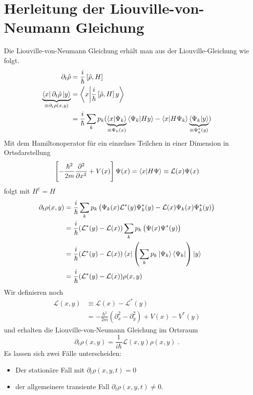 \section{Herleitung der Liouville-von-Neumann Gleichung}
Die Liouville-von-Neumann Gleichung erhält man aus der Liouville-Gleichung wie folgt.
\begin{align}
  \partial_t \hat{\rho} &= \frac{i}{\hbar}\left[\hat{\rho} , H\right] \\
  \underbrace{\bra{x} \partial_t \hat{\rho} \ket{y}}_{\equiv \partial_t \rho(x,y)} &= \bra{x}\ket{\frac{i}{\hbar}\left[\hat{\rho} , H\right]y} \\
   &= \frac{i}{\hbar} \sum_k p_k ( \underbrace{\bra{x}\ket{\Psi_k}}_{\equiv \Psi_k(x)}\bra{\Psi_k}\ket{Hy} - \bra{x}\ket{H\Psi_k}\underbrace{\bra{\Psi_k}\ket{y}}_{\equiv \Psi_k^*(y)} )
\end{align}
Mit dem Hamiltonoperator für ein einzelnes Teilchen in einer Dimension in Ortsdarstellung
\begin{align}
  \left[ -\frac{\hbar^2}{2m}\frac{\partial^2}{\partial x^2} + V(x) \right] \Psi(x) = \bra{x}\ket{H\Psi} \equiv \mathcal{L}(x)\Psi(x)
  \label{eq:Liouville-Operator}
\end{align}
folgt mit $H^{\dagger} = H$
\begin{align}
  \partial_t \rho(x,y) &= \frac{i}{\hbar} \sum_k p_k \left( \Psi_k(x)\mathcal{L}^*(y)\Psi_k^*(y) - \mathcal{L}(x)\Psi_k(x)\Psi_k^*(y) \right) \\
  &= \frac{i}{\hbar}  (\mathcal{L}^*(y) - \mathcal{L}(x)) \sum_k p_k \left( \Psi(x)\Psi^*(y) \right) \\
  &= \frac{i}{\hbar}  (\mathcal{L}^*(y) - \mathcal{L}(x)) \bra{x}\left(\sum_k p_k  \ket{\Psi_k}\bra{\Psi_k} \right)\ket{y} \\
  &= \frac{i}{\hbar}  (\mathcal{L}^*(y) - \mathcal{L}(x))\rho(x,y)
\end{align}
Wir definieren noch
\begin{align}
  \mathcal{L}(x,y) &\equiv \mathcal{L}(x) - \mathcal{L}^*(y)\\
   &= -\frac{\hbar^2}{2m}\left( \partial_x^2 - \partial_y^2 \right) + V(x) - V^*(y)
\end{align}
und erhalten die Liouville-von-Neumann Gleichung im Ortsraum
\begin{equation}
  \partial_t \rho(x,y) = \frac{1}{i\hbar} \mathcal{L}(x,y) \rho(x,y) \; .
  \label{eq:lvn_first}
\end{equation}
Es lassen sich zwei Fälle unterscheiden:
\begin{itemize}
  \item Der stationäre Fall mit $\partial_t \rho(x,y,t) = 0$
  \item der allgemeinere transiente Fall $\partial_t \rho(x,y,t) \neq 0$.
\end{itemize}

